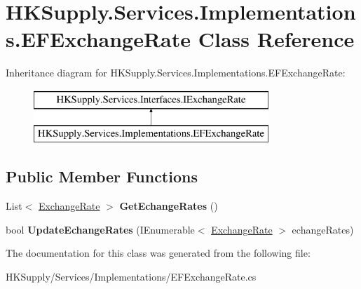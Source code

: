\hypertarget{class_h_k_supply_1_1_services_1_1_implementations_1_1_e_f_exchange_rate}{}\section{H\+K\+Supply.\+Services.\+Implementations.\+E\+F\+Exchange\+Rate Class Reference}
\label{class_h_k_supply_1_1_services_1_1_implementations_1_1_e_f_exchange_rate}
Inheritance diagram for H\+K\+Supply.\+Services.\+Implementations.\+E\+F\+Exchange\+Rate\+:\begin{figure}[H]
\begin{center}
\leavevmode
\includegraphics[height=2.000000cm]{class_h_k_supply_1_1_services_1_1_implementations_1_1_e_f_exchange_rate}
\end{center}
\end{figure}
\subsection*{Public Member Functions}
\begin{DoxyCompactItemize}
\item 
\mbox{\label{class_h_k_supply_1_1_services_1_1_implementations_1_1_e_f_exchange_rate_aae3728ce3ea879cca4caab3d2673e19a}} 
List$<$ \mbox{\hyperlink{class_h_k_supply_1_1_models_1_1_exchange_rate}{Exchange\+Rate}} $>$ {\bfseries Get\+Echange\+Rates} ()
\item 
\mbox{\label{class_h_k_supply_1_1_services_1_1_implementations_1_1_e_f_exchange_rate_af12c7fc9ec718f66d202e43dd1bad8a2}} 
bool {\bfseries Update\+Echange\+Rates} (I\+Enumerable$<$ \mbox{\hyperlink{class_h_k_supply_1_1_models_1_1_exchange_rate}{Exchange\+Rate}} $>$ echange\+Rates)
\end{DoxyCompactItemize}


The documentation for this class was generated from the following file\+:\begin{DoxyCompactItemize}
\item 
H\+K\+Supply/\+Services/\+Implementations/E\+F\+Exchange\+Rate.\+cs\end{DoxyCompactItemize}
